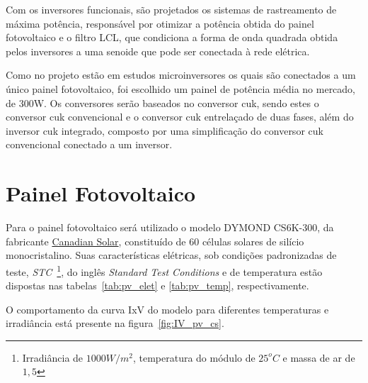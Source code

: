 \documentclass[
	12pt,				%
	openright,			%
	twoside,			%
	a4paper,			%
	english,			%
	french,				%
	spanish,			%
	brazil,				%
	]{abntex2}
\begin{document}
Com os inversores funcionais, são projetados os sistemas de rastreamento de máxima potência, responsável por otimizar a potência obtida do painel fotovoltaico e o filtro LCL, que condiciona a forma de onda quadrada obtida pelos inversores a uma senoide que pode ser conectada à rede elétrica.

Como no projeto estão em estudos microinversores os quais são conectados a um único painel fotovoltaico, foi escolhido um painel de potência média no mercado, de 300W. Os conversores serão baseados no conversor cuk, sendo estes o conversor cuk convencional e o conversor cuk entrelaçado de duas fases, além do inversor cuk integrado, composto por uma simplificação do conversor cuk convencional conectado a um inversor.

\section{Painel Fotovoltaico}

Para o painel fotovoltaico será utilizado o modelo DYMOND CS6K-300, da fabricante \href{https://www.canadiansolar.com/en}{Canadian Solar}, constituído de 60 células solares de silício monocristalino. Suas características elétricas, sob condições padronizadas de teste, \emph{STC}~\footnote{\label{foot_:STC} Irradiância de $1000W/m^2$, temperatura do módulo de $25^oC$ e massa de ar de $1,5$}, do inglês \textit{Standard Test Conditions} e de temperatura estão dispostas nas tabelas~\ref{tab:pv_elet} e \ref{tab:pv_temp}, respectivamente.

O comportamento da curva IxV do modelo para diferentes temperaturas e irradiância está presente na figura~\ref{fig:IV_pv_cs}. 
\end{document}

